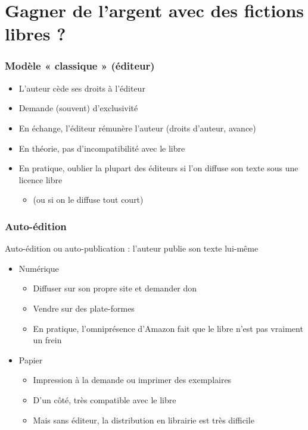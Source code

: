 \documentclass[11pt]{beamer}
\begin{document}
\section{Gagner de l'argent avec des fictions libres ?}

\begin{frame}
  \frametitle{Modèle « classique » (éditeur)}
    \begin{itemize}
    \item L'auteur cède ses droits à l'éditeur 
    \item Demande (souvent) d'exclusivité
    \item En échange, l'éditeur rémunère l'auteur (droits d'auteur, avance)
    \item En théorie, pas d'incompatibilité avec le libre
    \item En pratique, oublier la plupart des éditeurs si l'on diffuse
      son texte sous une licence libre
      \begin{itemize}
      \item (ou si on le diffuse tout court)
      \end{itemize}
  \end{itemize}
\end{frame}

\begin{frame}
  \frametitle{Auto-édition}
  Auto-édition ou auto-publication : l'auteur publie son texte lui-même
  \begin{itemize}
  \item Numérique
    \begin{itemize}
    \item Diffuser sur son propre site et demander don 
    \item Vendre sur des plate-formes
    \item En pratique, l'omniprésence d'Amazon fait que le libre n'est
      pas vraiment un frein
    \end{itemize}
  \item Papier
    \begin{itemize}
    \item Impression à la demande ou imprimer des exemplaires 
    \item D'un côté, très compatible avec le libre
    \item Mais sans éditeur, la distribution en librairie est très difficile
    \end{itemize}
  \end{itemize}
\end{frame}
\end{document}

